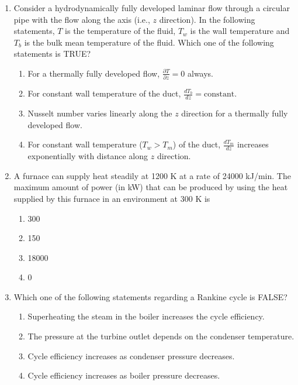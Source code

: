\documentclass[journal,11pt,onecolumn]{IEEEtran}
\begin{document}
\begin{enumerate}[resume]
    \item Consider a hydrodynamically fully developed laminar flow through a circular pipe with the flow along the axis (i.e., $z$ direction). In the following statements, $T$ is the temperature of the fluid, $T_w$ is the wall temperature and $T_b$ is the bulk mean temperature of the fluid. Which one of the following statements is TRUE?

          \begin{enumerate}
              \item For a thermally fully developed flow, $\frac{\partial T}{\partial z} = 0$ always.
              \item For constant wall temperature of the duct, $\frac{dT_b}{dz} = \text{constant}$.
              \item Nusselt number varies linearly along the $z$ direction for a thermally fully developed flow.
              \item For constant wall temperature ($T_w > T_m$) of the duct, $\frac{dT_m}{dz}$ increases exponentially with distance along $z$ direction.
          \end{enumerate}

    \item A furnace can supply heat steadily at 1200 K at a rate of 24000 kJ/min. The maximum amount of power (in kW) that can be produced by using the heat supplied by this furnace in an environment at 300 K is

          \begin{enumerate}
              \item 300
              \item 150
              \item 18000
              \item 0
          \end{enumerate}

    \item Which one of the following statements regarding a Rankine cycle is FALSE?

          \begin{enumerate}
              \item Superheating the steam in the boiler increases the cycle efficiency.
              \item The pressure at the turbine outlet depends on the condenser temperature.
              \item Cycle efficiency increases as condenser pressure decreases.
              \item Cycle efficiency increases as boiler pressure decreases.
          \end{enumerate}


\end{enumerate}
\end{document}
